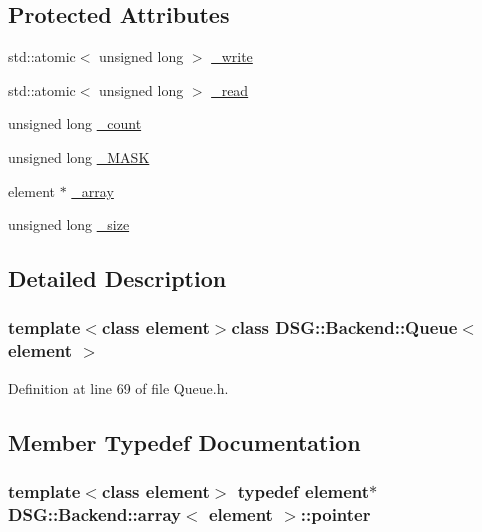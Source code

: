 \subsection*{Protected Attributes}
\begin{DoxyCompactItemize}
\item 
std\+::atomic$<$ unsigned long $>$ \hyperlink{classDSG_1_1Backend_1_1Queue_adbbe7e332752d500e7b9fadeb08cac54}{\+\_\+write}
\item 
std\+::atomic$<$ unsigned long $>$ \hyperlink{classDSG_1_1Backend_1_1Queue_a10510513da0290a435fe47079287cf29}{\+\_\+read}
\item 
unsigned long \hyperlink{classDSG_1_1Backend_1_1Queue_ae2ec3926f9e8cbabd17dadb309bcc26f}{\+\_\+count}
\item 
unsigned long \hyperlink{classDSG_1_1Backend_1_1Queue_ad82aa028cc33db5cc22a4c478dabe399}{\+\_\+\+M\+A\+S\+K}
\item 
element $\ast$ \hyperlink{classDSG_1_1Backend_1_1array_a520f838f921d4f48852694e79da0564c}{\+\_\+array}
\item 
unsigned long \hyperlink{classDSG_1_1Backend_1_1array_a44349f32c09ebb31d5eadbe9a222cba2}{\+\_\+size}
\end{DoxyCompactItemize}


\subsection{Detailed Description}
\subsubsection*{template$<$class element$>$class D\+S\+G\+::\+Backend\+::\+Queue$<$ element $>$}



Definition at line 69 of file Queue.\+h.



\subsection{Member Typedef Documentation}
\hypertarget{classDSG_1_1Backend_1_1array_abfd0db2267892f4d2f397638faf85ca3}{
\subsubsection[{pointer}]{\setlength{\rightskip}{0pt plus 5cm}template$<$class element$>$ typedef element$\ast$ {\bf D\+S\+G\+::\+Backend\+::array}$<$ element $>$\+::{\bf pointer}\hspace{0.3cm}{\ttfamily [inherited]}}}\label{classDSG_1_1Backend_1_1array_abfd0db2267892f4d2f397638faf85ca3}


